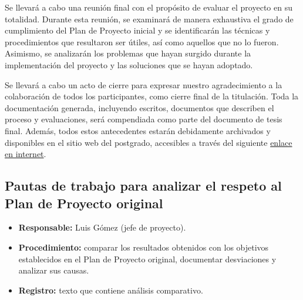 %
%


Se llevará a cabo una reunión final con el propósito de evaluar el proyecto en su totalidad. Durante esta reunión, se examinará de manera exhaustiva el grado de cumplimiento del Plan de Proyecto inicial y se identificarán las técnicas y procedimientos que resultaron ser útiles, así como aquellos que no lo fueron. Asimismo, se analizarán los problemas que hayan surgido durante la implementación del proyecto y las soluciones que se hayan adoptado.

Se llevará a cabo un acto de cierre para expresar nuestro agradecimiento a la colaboración de todos los participantes, como cierre final de la titulación. Toda la documentación generada, incluyendo escritos, documentos que describen el proceso y evaluaciones, será compendiada como parte del documento de tesis final. Además, todos estos antecedentes estarán debidamente archivados y disponibles en el sitio web del postgrado, accesibles a través del siguiente \href{https://lse.posgrados.fi.uba.ar/trabajo-final/archivo-historico/consulta-de-trabajos-finales-listado-completo}{enlace en internet}.

\subsection{Pautas de trabajo para analizar el respeto al Plan de Proyecto original}
\begin{itemize}
	\item \textbf{Responsable:} Luis Gómez (jefe de proyecto).
	\item \textbf{Procedimiento:} comparar los resultados obtenidos con los objetivos establecidos en el Plan de Proyecto original, documentar desviaciones y analizar sus causas.
	\item \textbf{Registro:} texto que contiene análisis comparativo.
\end{itemize}

